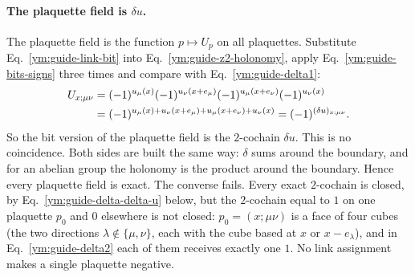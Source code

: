 \paragraph{The plaquette field is $\delta u$.}
The plaquette field is the function $p\mapsto U_p$ on all plaquettes.
Substitute Eq.~\eqref{ym:guide-link-bit} into
Eq.~\eqref{ym:guide-z2-holonomy}, apply Eq.~\eqref{ym:guide-bits-signs}
three times and compare with Eq.~\eqref{ym:guide-delta1}:
\begin{align}
 U_{x;\mu\nu}&=(-1)^{u_\mu(x)}(-1)^{u_\nu(x+e_\mu)}
 (-1)^{u_\mu(x+e_\nu)}(-1)^{u_\nu(x)}\notag\\
 &=(-1)^{u_\mu(x)+u_\nu(x+e_\mu)+u_\mu(x+e_\nu)+u_\nu(x)}
 =(-1)^{(\delta u)_{x;\mu\nu}}.\label{ym:guide-plaquette-delta}
\end{align}
So the bit version of the plaquette field is the $2$-cochain $\delta u$.
This is no coincidence. Both sides are built the same way: $\delta$ sums
around the boundary, and for an abelian group the holonomy is the product
around the boundary. Hence every plaquette field is exact. The converse
fails. Every exact $2$-cochain is closed, by
Eq.~\eqref{ym:guide-delta-delta-u} below, but the $2$-cochain equal to $1$ on one plaquette $p_0$ and $0$
elsewhere is not closed: $p_0=(x;\mu\nu)$ is a face of four cubes (the two
directions $\lambda\notin\{\mu,\nu\}$, each with the cube based at $x$ or
$x-e_\lambda$), and in Eq.~\eqref{ym:guide-delta2} each of them receives
exactly one $1$. No link assignment makes a single plaquette negative.

